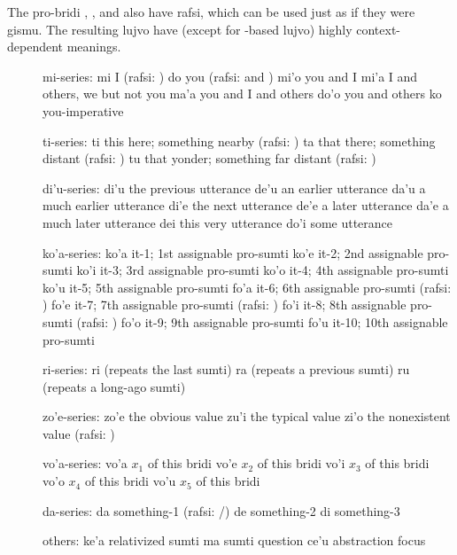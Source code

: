 The pro-bridi , , and  also have
    rafsi, which can be used just as if they were gismu. The
    resulting lujvo have (except for -based lujvo) highly
    context-dependent meanings.



\begin{description}
\item[] mi-series: mi I (rafsi: ) do you (rafsi:  and ) mi'o you and I mi'a I and others, we but not you ma'a you and I and others do'o you and others ko you-imperative
\item[] ti-series: ti this here; something nearby (rafsi: ) ta that there; something distant (rafsi: ) tu that yonder; something far distant (rafsi: )
\item[] di'u-series: di'u the previous utterance de'u an earlier utterance da'u a much earlier utterance di'e the next utterance de'e a later utterance da'e a much later utterance dei this very utterance do'i some utterance
\item[] ko'a-series: ko'a it-1; 1st assignable pro-sumti ko'e it-2; 2nd assignable pro-sumti ko'i it-3; 3rd assignable pro-sumti ko'o it-4; 4th assignable pro-sumti ko'u it-5; 5th assignable pro-sumti fo'a it-6; 6th assignable pro-sumti (rafsi: ) fo'e it-7; 7th assignable pro-sumti (rafsi: ) fo'i it-8; 8th assignable pro-sumti (rafsi: ) fo'o it-9; 9th assignable pro-sumti fo'u it-10; 10th assignable pro-sumti
\item[] ri-series: ri (repeats the last sumti) ra (repeats a previous sumti) ru (repeats a long-ago sumti)
\item[] zo'e-series: zo'e the obvious value zu'i the typical value zi'o the nonexistent value (rafsi: )
\item[] vo'a-series: vo'a $x_1$ of this bridi vo'e $x_2$ of this bridi vo'i $x_3$ of this bridi vo'o $x_4$ of this bridi vo'u $x_5$ of this bridi
\item[] da-series: da something-1 (rafsi: /) de something-2 di something-3
\item[] others: ke'a relativized sumti ma sumti question ce'u abstraction focus
\end{description}



